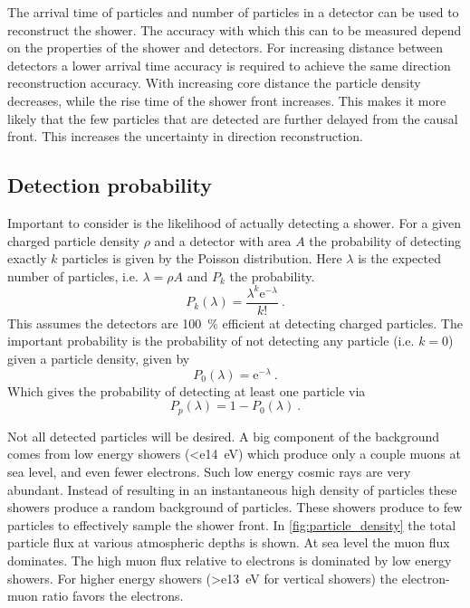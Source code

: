 The arrival time of particles and number of particles in a detector can be used to reconstruct the shower. The accuracy with which this can to be measured depend on the properties of the shower and detectors. For increasing distance between detectors a lower arrival time accuracy is required to achieve the same direction reconstruction accuracy. With increasing core distance the particle density decreases, while the rise time of the shower front increases. This makes it more likely that the few particles that are detected are further delayed from the causal front. This increases the uncertainty in direction reconstruction.

\subsection{Detection probability}

Important to consider is the likelihood of actually detecting a shower. For a given charged particle density $\rho$ and a detector with area $A$ the probability of detecting exactly $k$ particles is given by the Poisson distribution. Here $\lambda$ is the expected number of particles, i.e. $\lambda = \rho A$ and $P_k$ the probability.
%
\begin{equation}
    P_k(\lambda) = \frac{\lambda^k \mathrm{e}^{-\lambda}}{k!} \ .
\end{equation}
%
This assumes the detectors are \SI{100}{\percent} efficient at detecting charged particles. The important probability is the probability of not detecting any particle (i.e. $k = 0$) given a particle density, given by
%
\begin{equation}
    P_0(\lambda) = \mathrm{e}^{-\lambda} \ .
\end{equation}
%
Which gives the probability of detecting at least one particle via
%
\begin{equation}
    P_p(\lambda) = 1-P_0(\lambda) \ .
\end{equation}

Not all detected particles will be desired. A big component of the background comes from low energy showers (\SI{<e14}{\eV}) which produce only a couple muons at sea level, and even fewer electrons. Such low energy cosmic rays are very abundant. Instead of resulting in an instantaneous high density of particles these showers produce a random background of particles. These showers produce to few particles to effectively sample the shower front. In \cref{fig:particle_density} the total particle flux at various atmospheric depths is shown. At sea level the muon flux dominates. The high muon flux relative to electrons is dominated by low energy showers. For higher energy showers (\SI{>e13}{\eV} for vertical showers) the electron-muon ratio favors the electrons.

